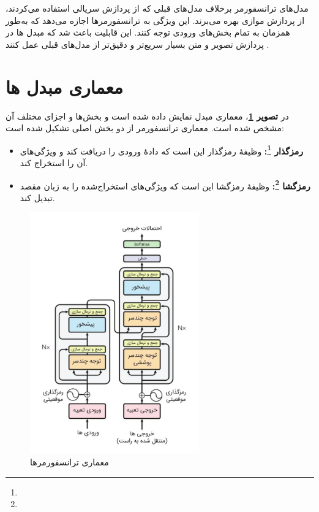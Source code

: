 مدل‌های ترانسفورمر برخلاف مدل‌های قبلی که از پردازش سریالی استفاده می‌کردند، از پردازش موازی بهره می‌برند. این ویژگی به ترانسفورمرها اجازه می‌دهد که به‌طور همزمان به تمام بخش‌های ورودی توجه کنند. این قابلیت باعث شد که مبدل ها در پردازش تصویر و متن بسیار سریع‌تر و دقیق‌تر از مدل‌های قبلی عمل کنند \cite{vaswani2017attention}.

\section{معماری مبدل ها}
در \textbf{تصویر \ref{fig:transformer_architecture}}، معماری مبدل نمایش داده شده است و بخش‌ها و اجزای مختلف آن مشخص شده است. معماری ترانسفورمر از دو بخش اصلی تشکیل شده است:
\begin{itemize}
\item \textbf{رمزگذار \footnote{}:}
وظیفهٔ رمزگذار این است که دادهٔ ورودی را دریافت کند و ویژگی‌های آن را استخراج کند.
\item \textbf{رمزگشا \footnote{}:}
وظیفهٔ رمزگشا این است که ویژگی‌های استخراج‌شده را به زبان مقصد تبدیل کند.
\end{itemize}

\begin{figure}[h]
	\centering
	\includegraphics[width=0.65\textwidth]{transformer_images/persian images/b04.png}
	\caption{معماری ترانسفورمرها}
	\label{fig:transformer_architecture}
\end{figure}

